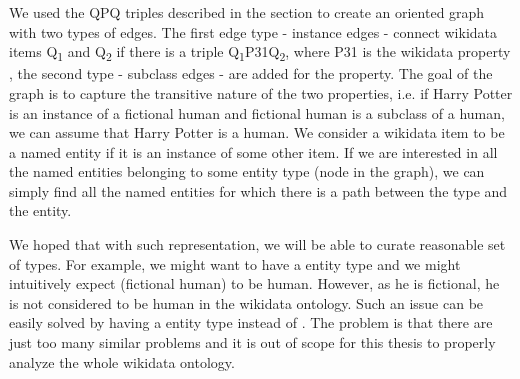 We used the QPQ triples described in the  section to create an oriented graph with two types of edges. The first edge type - instance edges - connect wikidata items Q\textsubscript{1} and Q\textsubscript{2} if there is a triple Q\textsubscript{1}P31Q\textsubscript{2}, where P31 is the wikidata property , the second type - subclass edges - are added for the  property. The goal of the graph is to capture the transitive nature of the two properties, i.e. if Harry Potter is an instance of a fictional human and fictional human is a subclass of a human, we can assume that Harry Potter is a human. We consider a wikidata item to be a named entity if it is an instance of some other item. If we are interested in all the named entities belonging to some entity type (node in the graph), we can simply find all the named entities for which there is a path between the type and the entity.

We hoped that with such representation, we will be able to curate reasonable set of types. For example, we might want to have a  entity type and we might intuitively expect  (fictional human) to be human. However, as he is fictional, he is not considered to be human in the wikidata ontology. Such an issue can be easily solved by having a  entity type instead of . The problem is that there are just too many similar problems and it is out of scope for this thesis to properly analyze the whole wikidata ontology. 


